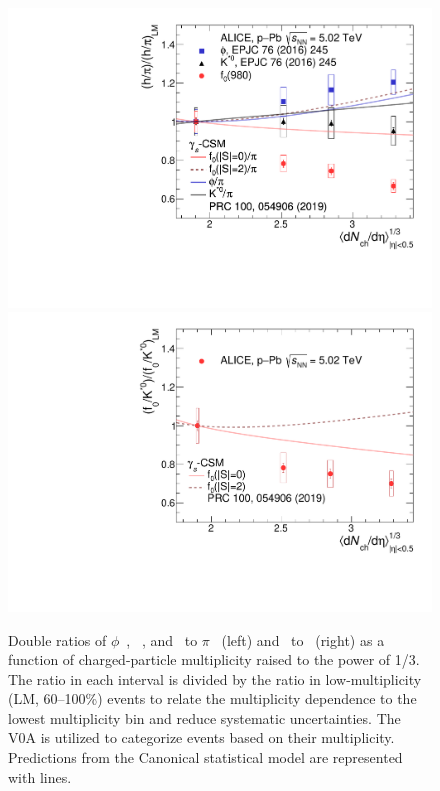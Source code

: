 \begin{figure}[!hbt]
	\centering
	\includegraphics[width=0.49 \textwidth]{figures/Fig4_dr_pion_addCSM_addpar.pdf} 
        \includegraphics[width=0.49 \textwidth]{figures/Fig4_dr_kstar_addCSM.pdf} 
	\caption{ Double ratios of $\phi$~\cite{ALICE:2016sak}, \kstar~\cite{ALICE:2016sak}, and \fzero~to $\pi$~\cite{ALICE:2016dei} (left) and \fzero~to \kstar~(right) as a function of charged-particle multiplicity raised to the power of 1/3. The ratio in each interval is divided by the ratio in low-multiplicity (LM, 60--100\%) events to relate the multiplicity dependence to the lowest multiplicity bin and reduce systematic uncertainties. The V0A is utilized to categorize events based on their multiplicity. Predictions from the Canonical statistical model are represented with lines. }
	\label{fig:f0piAddCSM}
\end{figure}

